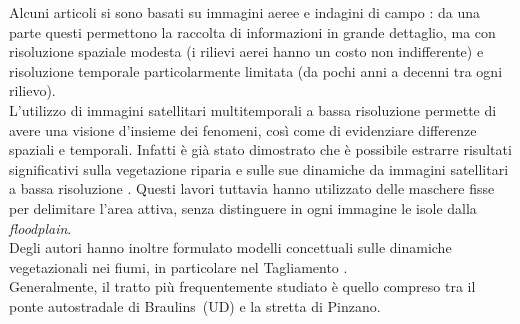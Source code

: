 Alcuni articoli si sono basati su immagini aeree e indagini di campo : da una parte questi permettono la raccolta di informazioni in grande dettaglio, ma con risoluzione spaziale modesta (i rilievi aerei hanno un costo non indifferente) e risoluzione temporale particolarmente limitata (da pochi anni a decenni tra ogni rilievo).
\\
L'utilizzo di immagini satellitari multitemporali a bassa risoluzione permette di avere una visione d'insieme dei fenomeni, così come di evidenziare differenze spaziali e temporali.
Infatti è già stato dimostrato che è possibile estrarre risultati significativi sulla vegetazione riparia e sulle sue dinamiche da immagini satellitari a bassa risoluzione .
Questi lavori tuttavia hanno utilizzato delle maschere fisse per delimitare l'area attiva, senza distinguere in ogni immagine le isole dalla \emph{floodplain}.
\\
Degli autori hanno inoltre formulato modelli concettuali sulle dinamiche vegetazionali nei fiumi, in particolare nel Tagliamento .
\\
Generalmente, il tratto più frequentemente studiato è quello compreso tra il ponte autostradale di Braulins~(UD) e la stretta di Pinzano.

